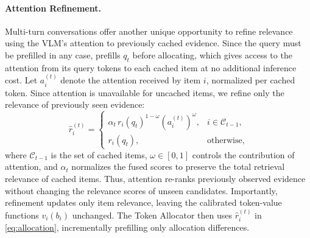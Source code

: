 \paragraph{Attention Refinement.}
Multi-turn conversations offer another unique opportunity to refine relevance using the VLM's attention to previously cached evidence. Since the query must be prefilled in any case, \name prefills $q_t$ before allocating, which gives access to the attention from its query tokens to each cached item at no additional inference cost. Let $a_i^{(t)}$ denote the attention received by item $i$, normalized per cached token. Since attention is unavailable for uncached items, we refine only the relevance of previously seen evidence:
\begin{equation}
\hat r_i^{(t)}=
\begin{cases}
\alpha_t\,r_i(q_t)^{1-\omega}(a_i^{(t)})^\omega,
& i\in\mathcal C_{t-1},\\
r_i(q_t), & \text{otherwise},
\end{cases}
\label{eq:fusion}
\end{equation}
where $\mathcal C_{t-1}$ is the set of cached items, $\omega\in[0,1]$ controls the contribution of attention, and $\alpha_t$ normalizes the fused scores to preserve the total retrieval relevance of cached items. Thus, attention re-ranks previously observed evidence without changing the relevance scores of unseen candidates. Importantly, refinement updates only item relevance, leaving the calibrated token-value functions $v_i(b_i)$ unchanged. The Token Allocator then uses $\hat r_i^{(t)}$ in \cref{eq:allocation}, incrementally prefilling only allocation differences.


